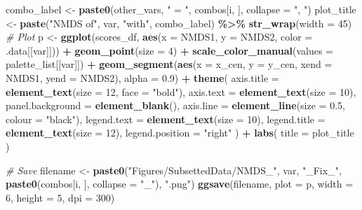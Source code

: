 \documentclass[
]{book}
\newenvironment{Shaded}{\begin{snugshade}}{\end{snugshade}}
\newcommand{\AttributeTok}[1]{\textcolor[rgb]{0.13,0.29,0.53}{#1}}
\newcommand{\CommentTok}[1]{\textcolor[rgb]{0.56,0.35,0.01}{\textit{#1}}}
\newcommand{\DecValTok}[1]{\textcolor[rgb]{0.00,0.00,0.81}{#1}}
\newcommand{\FloatTok}[1]{\textcolor[rgb]{0.00,0.00,0.81}{#1}}
\newcommand{\FunctionTok}[1]{\textcolor[rgb]{0.13,0.29,0.53}{\textbf{#1}}}
\newcommand{\NormalTok}[1]{#1}
\newcommand{\OtherTok}[1]{\textcolor[rgb]{0.56,0.35,0.01}{#1}}
\newcommand{\SpecialCharTok}[1]{\textcolor[rgb]{0.81,0.36,0.00}{\textbf{#1}}}
\newcommand{\StringTok}[1]{\textcolor[rgb]{0.31,0.60,0.02}{#1}}
\begin{document}
\begin{Shaded}
\begin{Highlighting}[]
\NormalTok{    combo\_label }\OtherTok{\textless{}{-}} \FunctionTok{paste0}\NormalTok{(other\_vars, }\StringTok{" = "}\NormalTok{, combos[i, ], }\AttributeTok{collapse =} \StringTok{", "}\NormalTok{)}
\NormalTok{    plot\_title  }\OtherTok{\textless{}{-}} \FunctionTok{paste}\NormalTok{(}\StringTok{"NMDS of"}\NormalTok{, var, }\StringTok{"with"}\NormalTok{, combo\_label) }\SpecialCharTok{\%\textgreater{}\%} 
      \FunctionTok{str\_wrap}\NormalTok{(}\AttributeTok{width =} \DecValTok{45}\NormalTok{) }
    \CommentTok{\# Plot}
\NormalTok{    p }\OtherTok{\textless{}{-}} \FunctionTok{ggplot}\NormalTok{(scores\_df, }\FunctionTok{aes}\NormalTok{(}\AttributeTok{x =}\NormalTok{ NMDS1, }\AttributeTok{y =}\NormalTok{ NMDS2, }\AttributeTok{color =}\NormalTok{ .data[[var]])) }\SpecialCharTok{+}
      \FunctionTok{geom\_point}\NormalTok{(}\AttributeTok{size =} \DecValTok{4}\NormalTok{) }\SpecialCharTok{+}
      \FunctionTok{scale\_color\_manual}\NormalTok{(}\AttributeTok{values =}\NormalTok{ palette\_list[[var]]) }\SpecialCharTok{+}
      \FunctionTok{geom\_segment}\NormalTok{(}\FunctionTok{aes}\NormalTok{(}\AttributeTok{x =}\NormalTok{ x\_cen, }\AttributeTok{y =}\NormalTok{ y\_cen, }\AttributeTok{xend =}\NormalTok{ NMDS1, }\AttributeTok{yend =}\NormalTok{ NMDS2), }\AttributeTok{alpha =} \FloatTok{0.9}\NormalTok{) }\SpecialCharTok{+}
      \FunctionTok{theme}\NormalTok{(}
        \AttributeTok{axis.title =} \FunctionTok{element\_text}\NormalTok{(}\AttributeTok{size =} \DecValTok{12}\NormalTok{, }\AttributeTok{face =} \StringTok{"bold"}\NormalTok{),}
        \AttributeTok{axis.text =} \FunctionTok{element\_text}\NormalTok{(}\AttributeTok{size =} \DecValTok{10}\NormalTok{),}
        \AttributeTok{panel.background =} \FunctionTok{element\_blank}\NormalTok{(),}
        \AttributeTok{axis.line =} \FunctionTok{element\_line}\NormalTok{(}\AttributeTok{size =} \FloatTok{0.5}\NormalTok{, }\AttributeTok{colour =} \StringTok{"black"}\NormalTok{),}
        \AttributeTok{legend.text =} \FunctionTok{element\_text}\NormalTok{(}\AttributeTok{size =} \DecValTok{10}\NormalTok{),}
        \AttributeTok{legend.title =} \FunctionTok{element\_text}\NormalTok{(}\AttributeTok{size =} \DecValTok{12}\NormalTok{),}
        \AttributeTok{legend.position =} \StringTok{"right"}
\NormalTok{      ) }\SpecialCharTok{+}
      \FunctionTok{labs}\NormalTok{(}
        \AttributeTok{title =}\NormalTok{ plot\_title}
\NormalTok{      )}
    
    \CommentTok{\# Save}
\NormalTok{   filename }\OtherTok{\textless{}{-}} \FunctionTok{paste0}\NormalTok{(}\StringTok{"Figures/SubsettedData/NMDS\_"}\NormalTok{, var, }\StringTok{"\_Fix\_"}\NormalTok{, }
                   \FunctionTok{paste0}\NormalTok{(combos[i, ], }\AttributeTok{collapse =} \StringTok{"\_"}\NormalTok{), }\StringTok{".png"}\NormalTok{)}
    \FunctionTok{ggsave}\NormalTok{(filename, }\AttributeTok{plot =}\NormalTok{ p, }\AttributeTok{width =} \DecValTok{6}\NormalTok{, }\AttributeTok{height =} \DecValTok{5}\NormalTok{, }\AttributeTok{dpi =} \DecValTok{300}\NormalTok{)}
    

\end{Highlighting}
\end{Shaded}
\end{document}
